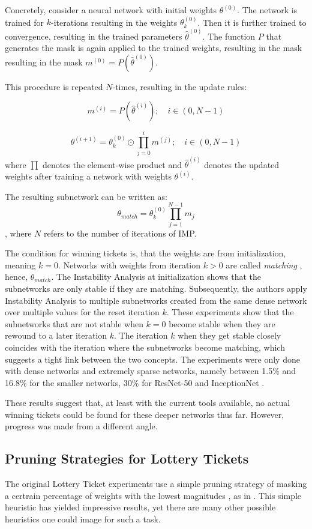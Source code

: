 Concretely, consider a neural network with initial weights $\theta^{(0)}$. The network is trained for $k$-iterations resulting in the weights $\theta_k^{(0)}$. Then it is further trained to convergence, resulting in the trained parameters $\hat \theta^{(0)}$.
The function $P$ that generates the mask is again applied to the trained weights, resulting in the mask resulting in the mask $m^{(0)} = \textit{P}(\hat \theta^{(0)})$.

This procedure is repeated $N$-times, resulting in the update rules:

$$
m^{(i)} = \textit{P}(\hat \theta^{(i)}); \quad i \in (0,N-1)
$$


$$\theta^{(i+1)} = \theta_k^{(0)} \odot \prod_{j=0}^{i}m^{(j)}; \quad i \in (0,N-1)$$ where $\prod$ denotes the element-wise product and $\hat \theta^{(i)}$ denotes the updated weights after training a network with weights $\theta^{(i)}$.

The resulting subnetwork can be written as:
$$
\theta_{match} = \theta_{k}^{(0)}\prod_{j=1}^{N-1}m_j
$$
, where $N$ refers to the number of iterations of IMP.

The condition for winning tickets is, that the weights are from initialization, meaning $k=0$. 
Networks with weights from iteration $k > 0$ are called \textit{matching} \autocite{LinearModeConnectivity}, hence, $\theta_{match}$.
The Instability Analysis at initialization shows that the subnetworks are only stable if they are matching.
Subsequently, the authors apply Instability Analysis to multiple subnetworks created from the same dense network over multiple values for the reset iteration $k$.
These experiments show that the subnetworks that are not stable when $k=0$ become stable when they are rewound to a later iteration $k$.
The iteration $k$ when they get stable closely coincides with the iteration where the subnetworks become matching, which suggests a tight link between the two concepts.
The experiments were only done with dense networks and extremely sparse networks, namely between 1.5\% and 16.8\% for the smaller networks, 30\% for ResNet-50 and InceptionNet \autocite{LinearModeConnectivity}.

These results suggest that, at least with the current tools available, no actual winning tickets could be found for these deeper networks thus far.
However, progress was made from a different angle.

\subsection{Pruning Strategies for Lottery Tickets}
The original Lottery Ticket experiments use a simple pruning strategy of masking a certrain percentage of weights with the lowest magnitudes \autocite{DBLP:conf/iclr/FrankleC19}, as in \autocite{HanEtAl15}. This simple heuristic has yielded impressive results, yet there are many other possible heuristics one could image for such a task.

